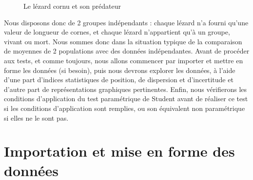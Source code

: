 \documentclass[
  a4paper,
  DIV=11,
  numbers=noendperiod,
  oneside]{scrreprt}
\begin{document}
\begin{figure}
\begin{minipage}[t]{0.33\linewidth}
{\centering 


}

\end{minipage}%

\caption{\label{fig-HornedLizards}Le lézard cornu et son prédateur}

\end{figure}

Nous disposons donc de 2 groupes indépendants : chaque lézard n'a fourni
qu'une valeur de longueur de cornes, et chaque lézard n'appartient qu'à
un groupe, vivant ou mort. Nous sommes donc dans la situation typique de
la comparaison de moyennes de 2 populations avec des données
indépendantes. Avant de procéder aux tests, et comme toujours, nous
allons commencer par importer et mettre en forme les données (si
besoin), puis nous devrons explorer les données, à l'aide d'une part
d'indices statistiques de position, de dispersion et d'incertitude et
d'autre part de représentations graphiques pertinentes. Enfin, nous
vérifierons les conditions d'application du test paramétrique de Student
avant de réaliser ce test si les conditions d'application sont remplies,
ou son équivalent non paramétrique si elles ne le sont pas.

\hypertarget{importation-et-mise-en-forme-des-donnuxe9es-2}{%
\section{Importation et mise en forme des
données}\label{importation-et-mise-en-forme-des-donnuxe9es-2}}
\end{document}
